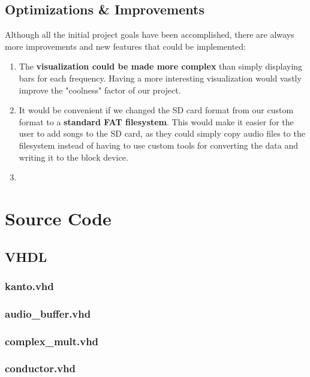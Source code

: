 \documentclass{article}
\begin{document}
\subsection{Optimizations \& Improvements}

Although all the initial project goals have been accomplished, there are always 
more improvements and new features that could be implemented: 
\begin{enumerate}
	\item The \textbf{visualization could be made more complex} than simply 
	displaying bars for each frequency. Having a more interesting visualization 
	would vastly improve the "coolness" factor of our project.
	\item It would be convenient if we changed the SD card format from our custom 
	format to a \textbf{standard FAT filesystem}. This would make it easier for the user to 
	add songs to the SD card, as they could simply copy audio files to the filesystem 
	instead of having to use custom tools for converting the data and writing it to the 
	block device.
	\item 
\end{enumerate}

\newpage
\appendix

\section{Source Code}
\subsection{VHDL}
	\subsubsection{kanto.vhd}
	
	\subsubsection{audio\_buffer.vhd}
	
	\subsubsection{complex\_mult.vhd}
	
	\subsubsection{conductor.vhd}
	
\end{document}
